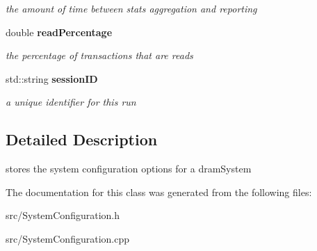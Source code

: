 \begin{CompactItemize}
\begin{CompactList}\small\item\em the amount of time between stats aggregation and reporting \item\end{CompactList}\item 
double {\bf readPercentage}\label{class_d_r_a_msim_i_i_1_1_system_configuration_7ab7f5c65f2e9221febeb4c9b0c2a9ac}

\begin{CompactList}\small\item\em the percentage of transactions that are reads \item\end{CompactList}\item 
std::string {\bf sessionID}\label{class_d_r_a_msim_i_i_1_1_system_configuration_e184c864eb50362bf6fefdeb70fc9a1c}

\begin{CompactList}\small\item\em a unique identifier for this run \item\end{CompactList}\end{CompactItemize}


\subsection{Detailed Description}
stores the system configuration options for a dramSystem 

The documentation for this class was generated from the following files:\begin{CompactItemize}
\item 
src/SystemConfiguration.h\item 
src/SystemConfiguration.cpp\end{CompactItemize}
